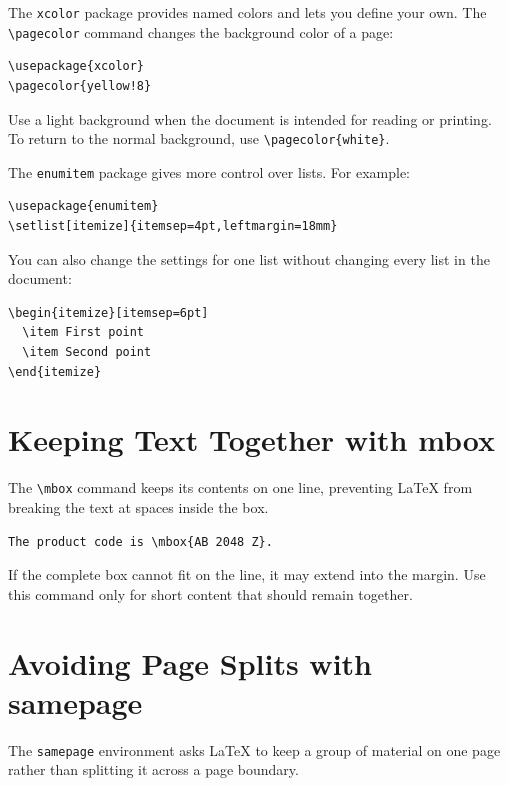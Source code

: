 \documentclass[12pt,a4paper]{article}
\begin{document}
The \texttt{xcolor} package provides named colors and lets you define your own.
The \verb|\pagecolor| command changes the background color of a page:

\begin{verbatim}
\usepackage{xcolor}
\pagecolor{yellow!8}
\end{verbatim}

Use a light background when the document is intended for reading or printing.
To return to the normal background, use \verb|\pagecolor{white}|.

The \texttt{enumitem} package gives more control over lists. For example:

\begin{verbatim}
\usepackage{enumitem}
\setlist[itemize]{itemsep=4pt,leftmargin=18mm}
\end{verbatim}

You can also change the settings for one list without changing every list in
the document:

\begin{verbatim}
\begin{itemize}[itemsep=6pt]
  \item First point
  \item Second point
\end{itemize}
\end{verbatim}

\section{Keeping Text Together with mbox}

The \verb|\mbox| command keeps its contents on one line, preventing LaTeX from
breaking the text at spaces inside the box.

\begin{verbatim}
The product code is \mbox{AB 2048 Z}.
\end{verbatim}

If the complete box cannot fit on the line, it may extend into the margin.
Use this command only for short content that should remain together.

\section{Avoiding Page Splits with samepage}

The \texttt{samepage} environment asks LaTeX to keep a group of material on
one page rather than splitting it across a page boundary.
\end{document}
